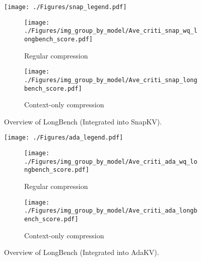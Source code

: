 \begin{figure*}[t]
	
	\begin{minipage}{0.495\linewidth}
		\centering
		\begin{minipage}{\linewidth}
			\texttt{[image: ./Figures/snap\_legend.pdf]}
		\end{minipage}
		\begin{subfigure}[b]{0.49\linewidth}
			\centering
			\texttt{[image: ./Figures/img\_group\_by\_model/Ave\_criti\_snap\_wq\_longbench\_score.pdf]}
			\vspace{-0.5cm}
			\caption{\centering Regular compression }
		\end{subfigure}
		\begin{subfigure}[b]{0.49\linewidth}
			\centering
			\texttt{[image: ./Figures/img\_group\_by\_model/Ave\_criti\_snap\_longbench\_score.pdf]}
			\vspace{-0.5cm}
			\caption{\centering Context-only compression}
			\label{fig:overview_snapkv_longbench_context}
		\end{subfigure}
		\vspace{-0.3cm}
		\caption{Overview of LongBench (Integrated into SnapKV). }
		\label{fig:overview_snapkv_longbench}
	\end{minipage}
	\begin{minipage}{0.495\linewidth}
		\begin{minipage}{\linewidth}
			\texttt{[image: ./Figures/ada\_legend.pdf]}
		\end{minipage}
		\begin{subfigure}[b]{0.49\linewidth}
			\centering
			\texttt{[image: ./Figures/img\_group\_by\_model/Ave\_criti\_ada\_wq\_longbench\_score.pdf]}
			\vspace{-0.5cm}
			\caption{\centering Regular compression}
			\label{subfig:overview_adakv_longbench_regular}
		\end{subfigure}
		\begin{subfigure}[b]{0.49\linewidth}
			\centering
			\texttt{[image: ./Figures/img\_group\_by\_model/Ave\_criti\_ada\_longbench\_score.pdf]}
			\vspace{-0.5cm}
			\caption{\centering Context-only compression}
			\label{subfig:overview_adakv_longbench_context}
		\end{subfigure}
		\vspace{-0.2cm}
		\caption{Overview of LongBench (Integrated into AdaKV). }
		\label{fig:overview_adakv_longbench}
	\end{minipage}
	
	
\end{figure*}



